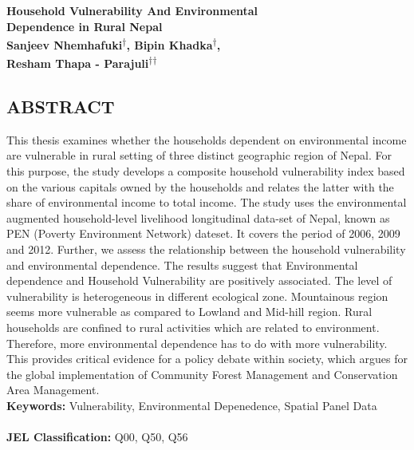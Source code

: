 \documentclass[12pt, a4paper]{article}
\begin{document}
\newpage %
	\begin{center}
		\textbf{\large{Household Vulnerability And Environmental\\ Dependence in Rural Nepal \\ \vspace{0.5cm}
		Sanjeev Nhemhafuki\textsuperscript{$\dag$}, Bipin Khadka\textsuperscript{$\dag$}, \\ Resham Thapa - Parajuli\textsuperscript{$\dag$}\textsuperscript{$\dag$}}}
	\end{center}
\begin{center}
\section*{\large{ABSTRACT}}
\end{center}	

\renewcommand{\thepage}{\roman{page}}
\setcounter{page}{5}
This thesis examines whether the households dependent on environmental income are vulnerable in rural setting of three distinct geographic region of Nepal. For this purpose, the study develops a composite household vulnerability index based on the various capitals owned by the households and relates the latter with the share of environmental income to total income. The study uses the environmental augmented household-level livelihood longitudinal data-set of Nepal, known as PEN (Poverty Environment Network) dateset. It covers the period of 2006, 2009 and 2012. Further, we assess the relationship between the household vulnerability and environmental dependence. The results suggest that Environmental dependence and Household Vulnerability are positively associated. The level of vulnerability is heterogeneous in different ecological zone. Mountainous region seems more vulnerable as compared to Lowland and Mid-hill region. Rural households are confined to rural activities which are related to environment. Therefore, more environmental dependence has to do with more vulnerability. This provides critical evidence for a policy debate within society, which argues for the global implementation of Community Forest Management and Conservation Area Management.   \\

\hspace{-0.6cm}\textbf{Keywords:} Vulnerability, Environmental Depenedence, Spatial Panel Data\\
\\
\hspace{-0.6cm}\textbf{JEL Classification:} Q00, Q50, Q56 
\end{document}
